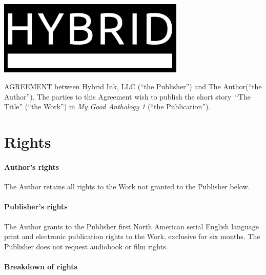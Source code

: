 \documentclass[12pt,letterpaper,oneside]{article}
\def\WorkTitle{The Title}
\def\WorkAuthor{The Author}
\def\WorkType{short story}
\def\Publication{My Good Anthology}
\def\Issue{ 1} %
\begin{document}
\begin{center}
    \noindent\includegraphics[width=3.5in]{logo}
\end{center}

\vspace{0.5in}

\noindent AGREEMENT between Hybrid Ink, LLC (``the Publisher'') and \WorkAuthor (``the Author''). The parties to this Agreement wish to publish the \WorkType\ ``\WorkTitle'' (``the Work'') in \textit{\Publication\Issue} (``the Publication'').

\section{Rights}

\paragraph{Author's rights}

The Author retains all rights to the Work not granted to the Publisher below.

\paragraph{Publisher's rights}

The Author grants to the Publisher first North American serial English language print and electronic publication rights to the Work, exclusive for six months. The Publisher does not request audiobook or film rights.

\paragraph{Breakdown of rights}
\end{document}
